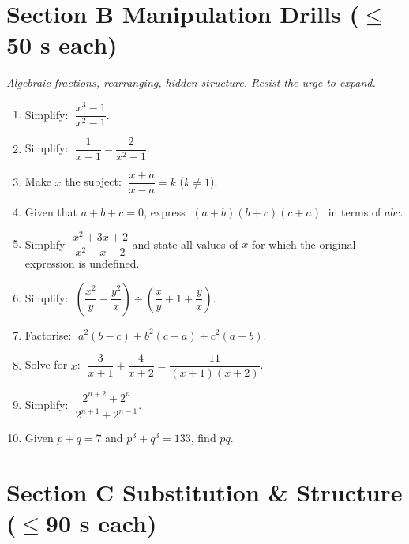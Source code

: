 \documentclass[11pt,a4paper]{article}
\begin{document}
\section*{Section B \quad Manipulation Drills \hfill{\normalfont\small($\leq$50 s each)}}

\noindent\textit{Algebraic fractions, rearranging, hidden structure. Resist the urge to expand.}

\begin{enumerate}

\item Simplify: $\;\dfrac{x^3 - 1}{x^2 - 1}$.

\item Simplify: $\;\dfrac{1}{x-1} - \dfrac{2}{x^2-1}$.

\item Make $x$ the subject: $\;\dfrac{x+a}{x-a} = k$ \quad ($k\neq 1$).

\item Given that $a+b+c=0$, express $\;(a+b)(b+c)(c+a)\;$ in terms of $abc$.

\item Simplify $\;\dfrac{x^2+3x+2}{x^2-x-2}$ and state all values of $x$ for which the original expression is undefined.

\item Simplify: $\;\left(\dfrac{x^2}{y} - \dfrac{y^2}{x}\right)\div\left(\dfrac{x}{y}+1+\dfrac{y}{x}\right)$.

\item Factorise: $\;a^2(b-c)+b^2(c-a)+c^2(a-b)$.

\item Solve for $x$: $\;\dfrac{3}{x+1}+\dfrac{4}{x+2} = \dfrac{11}{(x+1)(x+2)}$.

\item Simplify: $\;\dfrac{2^{n+2}+2^n}{2^{n+1}+2^{n-1}}$.

\item Given $p + q = 7$ and $p^3 + q^3 = 133$, find $pq$.

\end{enumerate}

\section*{Section C \quad Substitution \& Structure \hfill{\normalfont\small($\leq$90 s each)}}
\end{document}
